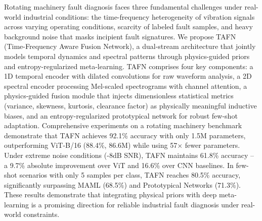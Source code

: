 Rotating machinery fault diagnosis faces three fundamental challenges under real-world industrial conditions: the time-frequency heterogeneity of vibration signals across varying operating conditions, scarcity of labeled fault samples, and heavy background noise that masks incipient fault signatures. We propose TAFN (Time-Frequency Aware Fusion Network), a dual-stream architecture that jointly models temporal dynamics and spectral patterns through physics-guided priors and entropy-regularized meta-learning. TAFN comprises four key components: a 1D temporal encoder with dilated convolutions for raw waveform analysis, a 2D spectral encoder processing Mel-scaled spectrograms with channel attention, a physics-guided fusion module that injects dimensionless statistical metrics (variance, skewness, kurtosis, clearance factor) as physically meaningful inductive biases, and an entropy-regularized prototypical network for robust few-shot adaptation. Comprehensive experiments on a rotating machinery benchmark demonstrate that TAFN achieves 92.1\% accuracy with only 1.5M parameters, outperforming ViT-B/16 (88.4\%, 86.6M) while using 57$\times$ fewer parameters. Under extreme noise conditions (-8dB SNR), TAFN maintains 61.8\% accuracy -- a 9.7\% absolute improvement over ViT and 16.6\% over CNN baselines. In few-shot scenarios with only 5 samples per class, TAFN reaches 80.5\% accuracy, significantly surpassing MAML (68.5\%) and Prototypical Networks (71.3\%). These results demonstrate that integrating physical priors with deep meta-learning is a promising direction for reliable industrial fault diagnosis under real-world constraints.
